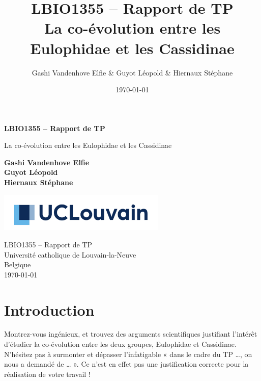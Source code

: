 \documentclass[a4paper, 11pt]{article}
\title{\Large LBIO1355 – Rapport de TP \\
\huge La co-évolution entre les Eulophidae et les Cassidinae}
\author{Gashi Vandenhove Elfie & Guyot Léopold & Hiernaux Stéphane}
\date{\today}
\begin{document}
\begin{titlepage}
   \begin{center}
       \vspace*{1cm}

        \LARGE
       \textbf{ LBIO1355 – Rapport de TP}

       \vspace{0.5cm}
       \Large
       La co-évolution entre les Eulophidae et les Cassidinae
            
       \vspace{1.5cm}
        \Large
       \textbf{Gashi Vandenhove Elfie\\ Guyot Léopold\\ Hiernaux Stéphane}

       \vfill
       \vspace{0.8cm}
     
       \includegraphics[width=0.6\textwidth]{UCLouvain_Logo_Pos_CMJN.pdf}
            
      \large LBIO1355 – Rapport de TP\\
       Université catholique de Louvain-la-Neuve\\
       Belgique\\
       \today
            
   \end{center}
\end{titlepage}


\pagestyle{fancy}
\fancyhead{}\fancyfoot{}
\section{Introduction}
Montrez-vous ingénieux, et trouvez des arguments scientifiques justifiant l’intérêt d’étudier la co-évolution entre les deux groupes, Eulophidae et Cassidinae. N’hésitez pas à surmonter et dépasser l’infatigable « dans le cadre du TP …, on nous a demandé de … ». Ce n’est en effet pas une justification correcte pour la réalisation de votre travail !
\end{document}
